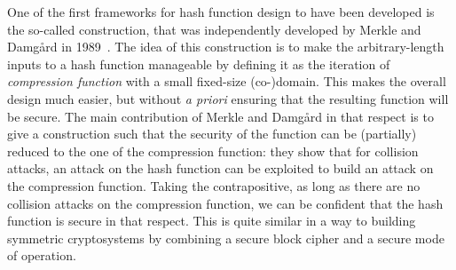 One of the first frameworks for hash function design to have been developed is the so-called \merkdam construction, that was independently developed by
Merkle and Damg\aa rd in 1989~\cite{DBLP:conf/crypto/Merkle89a,DBLP:conf/crypto/Damgard89a}. The idea of this construction is to make the arbitrary-length
inputs to a hash function manageable by defining it as the iteration of \emph{compression function} with a small fixed-size (co-)domain.
This makes the overall design much easier, but without \emph{a priori} ensuring that the resulting function will be secure. The main contribution of
Merkle and Damg\aa rd in that respect is to give a construction such that the security of the function can be (partially) reduced to the one of
the compression function: they show that for \eg collision attacks, an attack on the hash function can be exploited to build an attack on the compression function.
Taking the contrapositive, as long as there are no collision attacks on the compression function, we can be confident that the hash function is secure in that respect.
This is quite similar in a way to building symmetric cryptosystems by combining a secure block cipher and a secure mode of operation.


